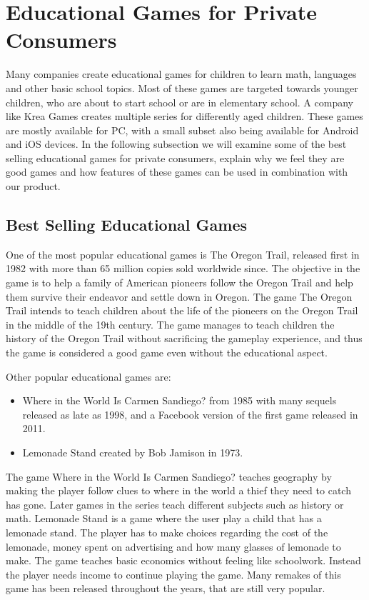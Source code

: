 \section{Educational Games for Private Consumers}
\label{sec:privateconsumers}
Many companies create educational games for children to learn math, languages and other basic school topics.
Most of these games are targeted towards younger children, who are about to start school or are in elementary school.
A company like Krea Games \cite{kreagames} creates multiple series for differently aged children.
These games are mostly available for PC, with a small subset also being available for Android and iOS devices.
In the following subsection we will examine some of the best selling educational games for private consumers, explain why we feel they are good games and how features of these games can be used in combination with our product.

\subsection{Best Selling Educational Games}
One of the most popular educational games is The Oregon Trail, released first in 1982 with more than 65 million copies sold worldwide since.\cite{oregontrail}
The objective in the game is to help a family of American pioneers follow the Oregon Trail and help them survive their endeavor and settle down in Oregon.
The game The Oregon Trail intends to teach children about the life of the pioneers on the Oregon Trail in the middle of the 19th century.
The game manages to teach children the history of the Oregon Trail without sacrificing the gameplay experience, and thus the game is considered a good game even without the educational aspect.\newline

Other popular educational games are:
\begin{itemize}
	\item Where in the World Is Carmen Sandiego? from 1985 with many sequels released as late as 1998, and a Facebook version of the first game released in 2011.\cite{carmensandiego}
	\item Lemonade Stand created by Bob Jamison in 1973.\cite{lemonadestand}
\end{itemize}

The game Where in the World Is Carmen Sandiego? teaches geography by making the player follow clues to where in the world a thief they need to catch has gone.
Later games in the series teach different subjects such as history or math.
Lemonade Stand is a game where the user play a child that has a lemonade stand.
The player has to make choices regarding the cost of the lemonade, money spent on advertising and how many glasses of lemonade to make.
The game teaches basic economics without feeling like schoolwork. Instead the player needs income to continue playing the game.
Many remakes of this game has been released throughout the years, that are still very popular.

